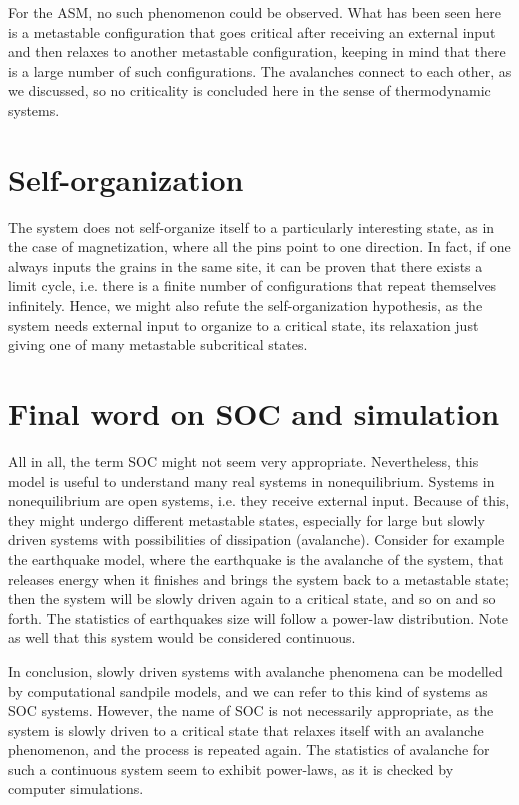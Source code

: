 For the ASM, no such phenomenon could be observed. What has been seen here is a metastable configuration that goes critical after receiving an external input and then relaxes to another metastable configuration, keeping in mind that there is a large number of such configurations. The avalanches connect to each other, as we discussed, so no criticality is concluded here in the sense of thermodynamic systems.

\section{Self-organization}
The system does not self-organize itself to a particularly interesting state, as in the case of magnetization, where all the pins point to one direction. In fact, if one always inputs the grains in the same site, it can be proven that there exists a limit cycle, i.e. there is a finite number of configurations that repeat themselves infinitely. Hence, we might also refute the self-organization hypothesis, as the system needs external input to organize to a critical state, its relaxation just giving one of many metastable subcritical states.

\section{Final word on SOC and simulation}
All in all, the term SOC might not seem very appropriate. Nevertheless, this model is useful to understand many real systems in nonequilibrium. Systems in nonequilibrium are open systems, i.e. they receive external input. Because of this, they might undergo different metastable states, especially for large but slowly driven systems with possibilities of dissipation (avalanche). Consider for example the earthquake model, where the earthquake is the avalanche of the system, that releases energy when it finishes and brings the system back to a metastable state; then the system will be slowly driven again to a critical state, and so on and so forth. The statistics of earthquakes size will follow a power-law distribution. Note as well that this system would be considered continuous.

In conclusion, slowly driven systems with avalanche phenomena can be modelled by computational sandpile models, and we can refer to this kind of systems as SOC systems. However, the name of SOC is not necessarily appropriate, as the system is slowly driven to a critical state that relaxes itself with an avalanche phenomenon, and the process is repeated again. The statistics of avalanche for such a continuous system seem to exhibit power-laws, as it is checked by computer simulations.



